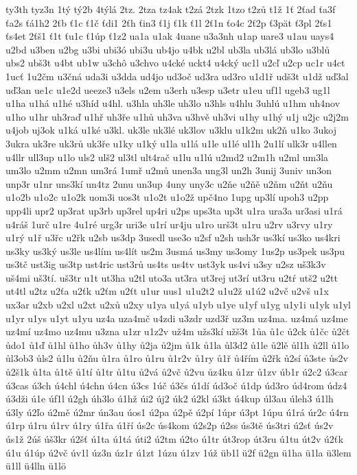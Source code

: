 {ty3th
tyz3n
1tý
tý2b
4týlá
2tz.
2tza
tz4ak
t2zá
2tzk
1tzo
t2zů
t1ž
1ť
2ťad
ťa3f
ťa2s
ťá1h2
2ťb
ť1c
ť1č
ťdi1
2ťh
ťin3
ť1j
ť1k
ť1l
2ť1n
ťo4c
2ť2p
ť3pät
ť3pl
2ťs1
ťs4et
2ťš1
ť1t
ťu1c
ť1úp
ť1z2
ua1a
u1ak
4uane
u3a3nh
u1ap
uare3
u1au
uays4
u2bd
u3ben
u2bg
u3bi
ubi3ó
ubi3u
ub4jo
u4bk
u2bl
ub3la
ub3lá
ub3lo
u3blů
ubs2
ubš3t
u4bt
ub1w
u3chô
u3chvo
u4cké
uckt4
u4cký
uc1l
u2cľ
u2cp
uc1r
u4ct
1ucť
1u2čm
u3čná
uda3i
u3dda
ud4jo
ud3oč
ud3ra
ud3ro
u1d1ř
udš3t
u1dž
uď3al
uď3an
ue1c
u1e2d
ueeze3
u3els
u2em
u3erh
u3esp
u3etr
u1eu
uf1l
ugeb3
ug1l
u1ha
u1há
u1hé
u3híd
u4hl.
u3hla
uh3le
uh3lo
u3hls
u4hlu
3uhlú
u1hm
uh4nov
u1ho
u1hr
uh3raď
u1hř
uh3ře
u1hů
uh3va
u3hvě
uh3vi
u1hy
u1hý
u1j
u2jc
u2j2m
u4job
uj3ok
u1ká
u1ké
u3kl.
uk3le
uk3lé
uk3lov
u3klu
u1k2m
uk2ň
u1ko
3ukoj
3ukra
uk3re
uk3rů
uk3ře
u1ky
u1ký
u1la
u1lá
u1le
u1lé
ul1h
2u1lí
ulk3r
u4llen
u4llr
ull3up
u1lo
uls2
ulš2
ul3tl
ult4rač
u1lu
u1lú
u2md2
u2m1h
u2ml
um3la
um3lo
u2mm
u2mn
um3rá
1umř
u2mů
unen3a
ung3l
un2h
3unij
3univ
un3on
unp3r
u1nr
uns3kí
un4tz
2unu
un3up
4uny
uny3c
u2ňe
u2ňě
u2ňm
u2ňt
u2ňu
u1o2b
u1o2c
u1o2k
uom3i
uos3t
u1o2t
u1o2ž
upč4no
1upg
up3lí
upoh3
u2pp
upp4li
upr2
up3rat
up3rb
up3rel
up4ri
u2ps
ups3ta
up3t
u1ra
ura3a
ur3asi
u1rá
u4ráš
1urč
u1re
4u1ré
urg3r
uri3e
u1rí
ur4ju
u1ro
urš3t
u1ru
u2rv
u3rvy
u1ry
u1rý
u1ř
u3řc
u2řk
u2sb
us3dp
3usedl
use3o
u2sf
u2sh
ush3r
us3kí
us3ko
us4kri
us3ky
us3ký
us3le
us4lím
us4lít
us2m
3usmá
us3my
us3omy
1us2p
us3pek
us3pu
us3tč
ust3ig
us3tp
ust4ric
ust3rů
us4ts
us4tv
ust3yk
us4vi
u3sy
u2sz
uš3k3v
uš4mi
uš3tí.
uš3tr
u1t
ut3ha
u2tl
uto3a
ut3ra
ut3rej
ut3rí
ut3ru
u2tŕ
utš2
u2tt
ut4tl
u2tz
u2ťa
u2ťk
u2ťm
u2ťt
u1ur
uus1
u1u2t2
u1u2ž
u1ú2
u2vč
u2vš
u1x
ux3ar
u2xb
u2xl
u2xt
u2xů
u2xy
u1ya
u1yá
u1yb
u1ye
u1yf
u1yg
u1y1i
u1yk
u1yl
u1yr
u1ys
u1yt
u1yu
uz4a
uza4mč
u4zdi
u3zdr
uzd3ř
uz3m
uz4ma.
uz4má
uz4me
uz4mí
uz4mo
uz4mu
u3zna
u1zr
u1z2v
už4m
užs3kí
užš3t
1ůa
ů1c
ů2ck
ů1čc
ů2čt
ůdo1
ů1ď
ů1hl
ů1ho
ůh3v
ů1hy
ů2ja
ů2jm
ů1k
ů1la
ůl3d2
ů1le
ů2lě
ůl1h
ů2ll
ů1lo
ůl3ob3
ůls2
ů1lu
ů2ňu
ů1ra
ů1ro
ů1ru
ů1r2v
ů1ry
ů1ř
ů4řím
ů2řk
ů2sí
ů3ste
ůs2v
ů2š1k
ů1ta
ů1tě
ů1tí
ů1tr
ů1tu
ů2vá
ů2vč
ů2vu
ůz4ku
ů1zr
ů1zv
úb1r
ú2c2
ú3car
ú3cas
ú3ch
ú4chl
ú4chn
ú4cn
ú3cs
1úč
ú3čs
ú1dí
úd3oč
ú1dp
úd3ro
úd4rom
údz4
ú3dži
ú1e
úf1l
ú2gh
úh3lo
ú1hž
úi2
új2
úk2
ú2kl
ú3kt
ú4kup
úl3au
úleh3
ú1lh
ú3ly
ú2ľo
ú2mě
ú2mr
ún3au
úos1
ú2pa
ú2pě
ú2pí
1úpr
ú3pt
1úpu
ú1rá
úr2c
ú4rn
ú1rp
ú1ru
ú1rv
ú1ry
ú1řa
ú1ří
ús2c
ús4kom
ú2s2p
ú2ss
ús3tě
ús3tri
ú2sť
ús2v
ús1ž
2úš
úš3kr
ú2šť
ú1ta
ú1tá
úti2
ú2tm
ú2to
ú1tr
út3rop
út3ru
ú1tu
út2v
ú2ťk
ú1u
ú1úp
ú2vč
úv1l
úz3n
úz1r
ú1zt
1úzu
ú1zv
1úž
üb1l
ü2f
ü2gn
ü1ha
ü1la
ü3lem
ü1ll
ü4lln
ü1lö
}
